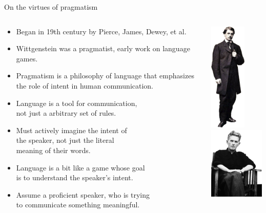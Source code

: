 \documentclass{beamer}
\begin{document}
\begin{frame}[fragile]{On the virtues of pragmatism}
  \begin{columns}[T]
    \begin{column}{0.9\textwidth}
      \begin{itemize}
        \item Began in 19th century by Pierce, James, Dewey, et al.
        \item Wittgenstein was a pragmatist, early work on language games.
        \item Pragmatism is a philosophy of language that emphasizes the role of intent in human communication.
        \item Language is a tool for communication, \\not just a arbitrary set of rules.
        \item Must actively imagine the intent of\\ the speaker, not just the literal\\meaning of their words.
        \item Language is a bit like a game whose goal \\is to understand the speaker's intent.
        \item Assume a proficient speaker, who is trying \\to communicate something meaningful.
      \end{itemize}
    \end{column}
    \begin{column}{0.6\textwidth}
      \vspace*{2cm}
      \hspace*{-3cm}
      \includegraphics[width=1.7cm]{../figures/photo_pierce.png}
      \includegraphics[width=2.6cm]{../figures/photo_wittgenstein.png}
    \end{column}
  \end{columns}
\end{frame}
\end{document}
